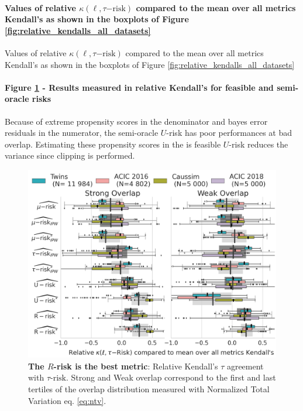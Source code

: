 \documentclass{report}
\begin{document}
\begin{appendices}
  \paragraph{Values of relative $\kappa(\ell,\tau\mathrm{{-risk}})$ compared to
    the mean over all metrics Kendall's as shown in the boxplots of Figure \ref{fig:relative_kendalls_all_datasets}}

  \begin{table}
    \centering
    \resizebox{0.7\textwidth}{!}{
      
    }
    \caption{Values of relative $\kappa(\ell,\tau\mathrm{{-risk}})$ compared to
      the mean over all metrics Kendall's as shown in the boxplots of Figure
      \ref{fig:relative_kendalls_all_datasets}}\label{apd:table:relative_kendalls_all_datasets}
  \end{table}


  \paragraph{Figure \ref{apd:fig:relative_kendalls_all_datasets_all_metrics} -
    Results measured in relative Kendall's for feasible and semi-oracle risks}

  Because of extreme propensity scores in the denominator and bayes error residuals in the numerator, the semi-oracle
  $U$-risk has poor performances at bad overlap. Estimating these propensity scores in the is feasible $U$-risk reduces
  the variance since clipping is performed.

  \begin{figure}[!b]
    \centering
    \includegraphics[width=\linewidth]{img/chapter_5/_1_r_risk_domination_r_risk_domination__ref_metric_mean_risks_by_Dataset.png}
    \caption{\textbf{The $R$-risk is the best metric}: Relative Kendall's $\tau$
      agreement with $\tau\text{-risk}$. Strong and Weak overlap correspond to
      the first and last tertiles of the overlap distribution measured with
      Normalized Total Variation eq. \ref{eq:ntv}.
    }\label{apd:fig:relative_kendalls_all_datasets_all_metrics}
  \end{figure}


\end{appendices}
\end{document}
